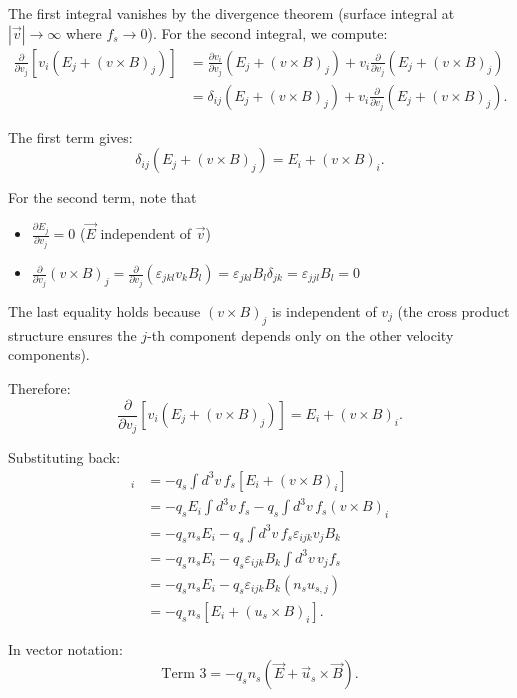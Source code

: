 The first integral vanishes by the divergence theorem (surface integral at $|\vec{v}| \to \infty$ where $f_s \to 0$).
For the second integral, we compute:
\begin{align*}
\frac{\partial}{\partial v_j}[v_i (E_j + (v \times B)_j)] &= \frac{\partial v_i}{\partial v_j}(E_j + (v \times B)_j) + v_i \frac{\partial}{\partial v_j}(E_j + (v \times B)_j)  \\
&= \delta_{ij}(E_j + (v \times B)_j) + v_i \frac{\partial}{\partial v_j}(E_j + (v \times B)_j).
\end{align*}

The first term gives:
\begin{equation*}
\delta_{ij}(E_j + (v \times B)_j) = E_i + (v \times B)_i.
\end{equation*}

For the second term, note that
\begin{itemize}
\item $\frac{\partial E_j}{\partial v_j} = 0$ \quad ($\vec{E}$ independent of $\vec{v}$)
\item $\frac{\partial}{\partial v_j}(v \times B)_j = \frac{\partial}{\partial v_j}(\varepsilon_{jkl} v_k B_l) = \varepsilon_{jkl} B_l \delta_{jk} = \varepsilon_{jjl} B_l = 0$
\end{itemize}

The last equality holds because $(v \times B)_j$ is independent of $v_j$ (the cross product structure ensures the $j$-th component depends only on the other velocity components).

Therefore:
\begin{equation*}
\frac{\partial}{\partial v_j}[v_i (E_j + (v \times B)_j)] = E_i + (v \times B)_i.
\end{equation*}

Substituting back:
\begin{align*}
[\text{Term 3}]_i &= -q_s \int d^3v \, f_s [E_i + (v \times B)_i]  \\
&= -q_s E_i \int d^3v \, f_s - q_s \int d^3v \, f_s (v \times B)_i  \\
&= -q_s n_s E_i - q_s \int d^3v \, f_s \varepsilon_{ijk} v_j B_k  \\
&= -q_s n_s E_i - q_s \varepsilon_{ijk} B_k \int d^3v \, v_j f_s  \\
&= -q_s n_s E_i - q_s \varepsilon_{ijk} B_k (n_s u_{s,j})  \\
&= -q_s n_s [E_i + (u_s \times B)_i].
\end{align*}

In vector notation:
\begin{equation*}
\text{Term 3} = -q_s n_s (\vec{E} + \vec{u}_s \times \vec{B}).
\end{equation*}

